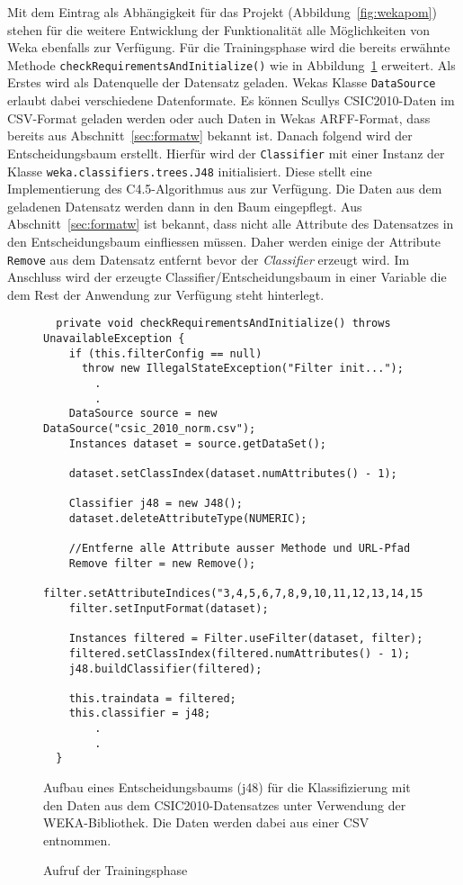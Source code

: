 Mit dem Eintrag als Abhängigkeit für das Projekt (Abbildung~\ref{fig:wekapom}) stehen für die weitere Entwicklung der Funktionalität alle Möglichkeiten von Weka ebenfalls zur Verfügung. Für die Trainingsphase wird die bereits erwähnte Methode \verb=checkRequirementsAndInitialize()= wie in Abbildung~\ref{fig:wekatrain} erweitert. Als Erstes wird als Datenquelle der Datensatz geladen. Wekas Klasse \verb=DataSource= erlaubt dabei verschiedene Datenformate. Es können Scullys CSIC2010-Daten im CSV-Format geladen werden oder auch Daten in Wekas ARFF-Format, dass bereits aus Abschnitt~\ref{sec:formatw} bekannt ist. Danach folgend wird der Entscheidungsbaum erstellt. Hierfür wird der \verb=Classifier= mit einer Instanz der Klasse \verb=weka.classifiers.trees.J48= initialisiert. Diese stellt eine Implementierung des C4.5-Algorithmus aus \cite{Quinlan1993} zur Verfügung. Die Daten aus dem geladenen Datensatz werden dann in den Baum eingepflegt. Aus Abschnitt~\ref{sec:formatw} ist bekannt, dass nicht alle Attribute des Datensatzes in den Entscheidungsbaum einfliessen müssen. Daher werden einige der Attribute \verb=Remove= aus dem Datensatz entfernt bevor der \emph{Classifier} erzeugt wird. Im Anschluss wird der erzeugte Classifier/Entscheidungsbaum in einer Variable die dem Rest der Anwendung zur Verfügung steht hinterlegt.\\

\begin{figure}[h]
  \centering
  \begin{lstlisting}
  private void checkRequirementsAndInitialize() throws UnavailableException {
    if (this.filterConfig == null)
      throw new IllegalStateException("Filter init...");
        .
        .
    DataSource source = new DataSource("csic_2010_norm.csv");
    Instances dataset = source.getDataSet();
                       
    dataset.setClassIndex(dataset.numAttributes() - 1);

    Classifier j48 = new J48();
    dataset.deleteAttributeType(NUMERIC);

    //Entferne alle Attribute ausser Methode und URL-Pfad
    Remove filter = new Remove();
    filter.setAttributeIndices("3,4,5,6,7,8,9,10,11,12,13,14,15,16,17");
    filter.setInputFormat(dataset);

    Instances filtered = Filter.useFilter(dataset, filter);
    filtered.setClassIndex(filtered.numAttributes() - 1);
    j48.buildClassifier(filtered);

    this.traindata = filtered;
    this.classifier = j48;
        .
        .
  }
\end{lstlisting}
\caption{Aufruf der Trainingsphase}
\medskip
\small
Aufbau eines Entscheidungsbaums (j48) für die Klassifizierung mit den Daten aus dem CSIC2010-Datensatzes unter Verwendung der WEKA-Bibliothek. Die Daten werden dabei aus einer CSV entnommen.
\label{fig:wekatrain}

\end{figure}



